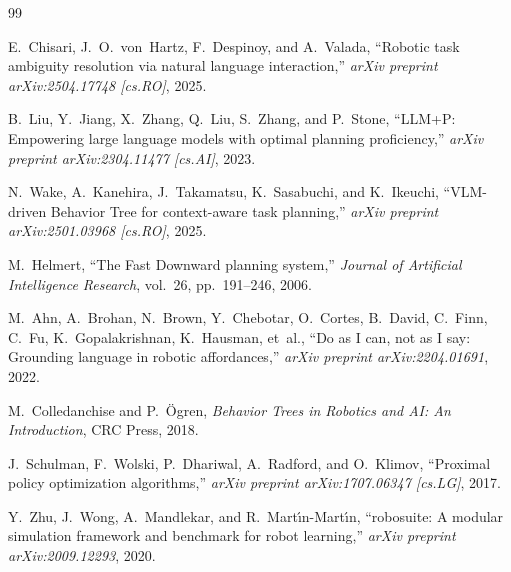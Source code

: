 \documentclass[conference]{IEEEtran}
\begin{document}
\begin{thebibliography}{99}

E.~Chisari, J.~O.~von~Hartz, F.~Despinoy, and A.~Valada,
\newblock ``Robotic task ambiguity resolution via natural language interaction,''
\newblock \emph{arXiv preprint arXiv:2504.17748 [cs.RO]}, 2025.

B.~Liu, Y.~Jiang, X.~Zhang, Q.~Liu, S.~Zhang, and P.~Stone,
\newblock ``LLM+P: Empowering large language models with optimal planning proficiency,''
\newblock \emph{arXiv preprint arXiv:2304.11477 [cs.AI]}, 2023.

N.~Wake, A.~Kanehira, J.~Takamatsu, K.~Sasabuchi, and K.~Ikeuchi,
\newblock ``VLM-driven Behavior Tree for context-aware task planning,''
\newblock \emph{arXiv preprint arXiv:2501.03968 [cs.RO]}, 2025.

M.~Helmert,
\newblock ``The Fast Downward planning system,''
\newblock \emph{Journal of Artificial Intelligence Research}, vol.~26, pp.~191--246, 2006.

M.~Ahn, A.~Brohan, N.~Brown, Y.~Chebotar, O.~Cortes, B.~David, C.~Finn, C.~Fu, K.~Gopalakrishnan, K.~Hausman, et~al.,
\newblock ``Do as I can, not as I say: Grounding language in robotic affordances,''
\newblock \emph{arXiv preprint arXiv:2204.01691}, 2022.

M.~Colledanchise and P.~Ögren,
\newblock \emph{Behavior Trees in Robotics and AI: An Introduction},
\newblock CRC Press, 2018.

J.~Schulman, F.~Wolski, P.~Dhariwal, A.~Radford, and O.~Klimov,
\newblock ``Proximal policy optimization algorithms,''
\newblock \emph{arXiv preprint arXiv:1707.06347 [cs.LG]}, 2017.

Y.~Zhu, J.~Wong, A.~Mandlekar, and R.~Mart{\'\i}n-Mart{\'\i}n,
\newblock ``robosuite: A modular simulation framework and benchmark for robot learning,''
\newblock \emph{arXiv preprint arXiv:2009.12293}, 2020.

\end{thebibliography}
\end{document}
